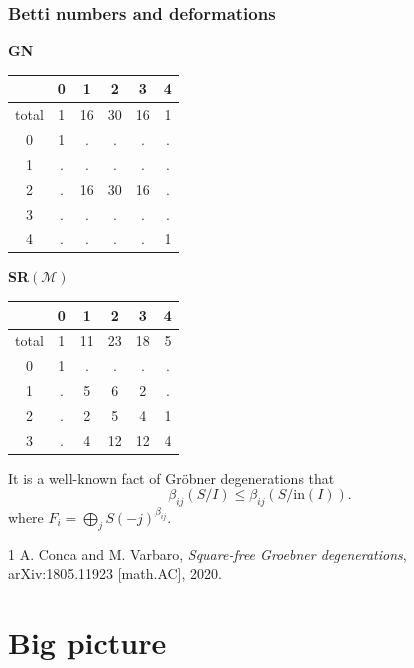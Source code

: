 \documentclass{beamer}
\begin{document}
\begin{frame}
\frametitle{Betti numbers and deformations}

\begin{minipage}{0.45\textwidth}
\centering
\textbf{GN}
\vspace{1em}

\begin{tabular}{c|ccccc}
 & 0 & 1 & 2 & 3 & 4 \\
\hline
total & 1 & 16 & 30 & 16 & 1 \\
0 & 1 & . & . & . & . \\
1 & . & . & . & . & . \\
2 & . & 16 & 30 & 16 & . \\
3 & . & . & . & . & . \\
4 & . & . & . & . & 1 \\
\end{tabular}
\end{minipage}
\hfill
\begin{minipage}{0.45\textwidth}
\centering
\textbf{SR}$(\mathcal{M})$
\vspace{1.5em}

\begin{tabular}{c|ccccc}
 & 0 & 1 & 2 & 3 & 4 \\
\hline
total & 1 & 11 & 23 & 18 & 5 \\
0 & 1 & . & . & . & . \\
1 & . & 5 & 6 & 2 & . \\
2 & . & 2 & 5 & 4 & 1 \\
3 & . & 4 & 12 & 12 & 4 \\
\end{tabular}
\end{minipage}

\vspace{1em}
It is a well-known fact of Gröbner degenerations that
$$
\beta_{ij}(S/I)\leq \beta_{ij}(S/\text{in}(I)).
$$
where $F_i=\bigoplus_jS(-j)^{\beta_{ij}}$.
{\footnotesize
\begin{thebibliography}{1}
A. Conca and M. Varbaro,
\emph{Square-free Groebner degenerations},
arXiv:1805.11923 [math.AC], 2020.
\end{thebibliography}
}
\end{frame}
\fi

\section{Big picture}
\end{document}
